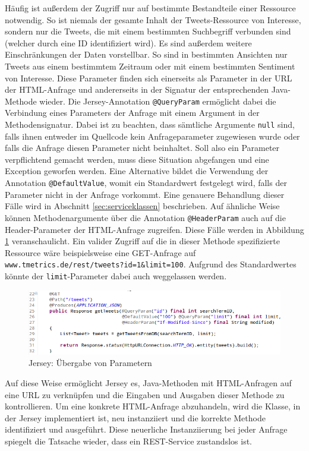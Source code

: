 Häufig ist außerdem der Zugriff nur auf bestimmte Bestandteile einer Ressource notwendig. So ist niemals der gesamte Inhalt der Tweets-Ressource von Interesse, sondern nur die Tweets, die mit einem bestimmten Suchbegriff verbunden sind (welcher durch eine ID identifiziert wird). Es sind außerdem weitere Einschränkungen der Daten vorstellbar. So sind in bestimmten Ansichten nur Tweets aus einem bestimmtem Zeitraum oder mit einem bestimmten Sentiment von Interesse. Diese Parameter finden sich einerseits als Parameter in der URL der HTML-Anfrage und andererseits in der Signatur der entsprechenden Java-Methode wieder. Die Jersey-Annotation \texttt{@QueryParam} ermöglicht dabei die Verbindung eines Parameters der Anfrage mit einem Argument in der Methodensignatur. Dabei ist zu beachten, dass sämtliche Argumente \texttt{null} sind, falls ihnen entweder im Quellcode kein Anfrageparameter zugewiesen wurde oder falls die Anfrage diesen Parameter nicht beinhaltet. Soll also ein Parameter verpflichtend gemacht werden, muss diese Situation abgefangen und eine Exception geworfen werden. Eine Alternative bildet die Verwendung der Annotation \texttt{@DefaultValue}, womit ein Standardwert festgelegt wird, falls der Parameter nicht in der Anfrage vorkommt. Eine genauere Behandlung dieser Fälle wird in Abschnitt \ref{sec:serviceklassen} beschrieben. Auf ähnliche Weise können Methodenargumente über die Annotation \texttt{@HeaderParam} auch auf die Header-Parameter der HTML-Anfrage zugreifen. Diese Fälle werden in Abbildung \ref{jerseyparams} veranschaulicht. Ein valider Zugriff auf die in dieser Methode spezifizierte Ressource wäre beispielsweise eine GET-Anfrage auf \texttt{www.tmetrics.de/rest/tweets?id=1\&limit=100}. Aufgrund des Standardwertes könnte der \texttt{limit}-Parameter dabei auch weggelassen werden.

\begin{figure}[h]
\centering
\includegraphics[scale=0.6]{Bilder/REST/JerseyParams.png}
\caption{Jersey: Übergabe von Parametern}
\label{jerseyparams}
\end{figure}

Auf diese Weise ermöglicht Jersey es, Java-Methoden mit HTML-Anfragen auf eine URL zu verknüpfen und die Eingaben und Ausgaben dieser Methode zu kontrollieren. Um eine konkrete HTML-Anfrage abzuhandeln, wird die Klasse, in der Jersey implementiert ist, neu instanziiert und die korrekte Methode identifiziert und ausgeführt. Diese neuerliche Instanziierung bei jeder Anfrage spiegelt die Tatsache wieder, dass ein REST-Service zustandslos ist.